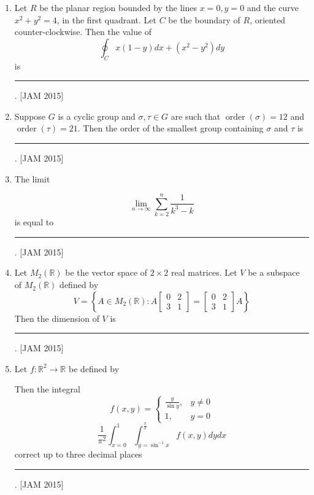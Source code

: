 \begin{enumerate}
Q. $11-$ Q. 20 carry two marks each.

\item  Let $R$ be the planar region bounded by the lines $x=0, y=0$ and the curve $x^{2}+y^{2}=4$, in the first quadrant. Let $C$ be the boundary of $R$, oriented counter-clockwise. Then the value of
$$
\oint_{C} x(1-y) d x+\left(x^{2}-y^{2}\right) d y
$$
is \rule{3cm}{1pt}.
\hfill [JAM 2015]




\item  Suppose $G$ is a cyclic group and $\sigma, \tau \in G$ are such that $\operatorname{order}(\sigma)=12$ and $\operatorname{order}(\tau)=21$. Then the order of the smallest group containing $\sigma$ and $\tau$ is \rule{3cm}{1pt}.
\hfill [JAM 2015]




\item  The limit

$$
\lim _{n \rightarrow \infty} \sum_{k=2}^{n} \frac{1}{k^{3}-k}
$$
is equal to \rule{3cm}{1pt}.
\hfill [JAM 2015]





\item  Let $M_{2}(\mathbb{R})$ be the vector space of $2 \times 2$ real matrices. Let $V$ be a subspace of $M_{2}(\mathbb{R})$ defined by
$$
V=\left\{A \in M_{2}(\mathbb{R}): A\left[\begin{array}{ll}
0 & 2 \\
3 & 1
\end{array}\right]=\left[\begin{array}{ll}
0 & 2 \\
3 & 1
\end{array}\right] A\right\}
$$
Then the dimension of $V$ is \rule{3cm}{1pt}.
\hfill [JAM 2015]




\item  

Let $f: \mathbb{R}^{2} \rightarrow \mathbb{R}$ be defined by

Then the integral
$$
f(x, y)=\left\{\begin{array}{cc}
\frac{y}{\sin y}, & y \neq 0 \\
1, & y=0
\end{array}\right.
$$
$$
\frac{1}{\pi^{2}} \int_{x=0}^{1} \int_{y=\sin ^{-1} x}^{\frac{\pi}{2}} f(x, y) d y d x
$$
correct up to three decimal places \rule{3cm}{1pt}.
\hfill [JAM 2015]





\end{enumerate}
